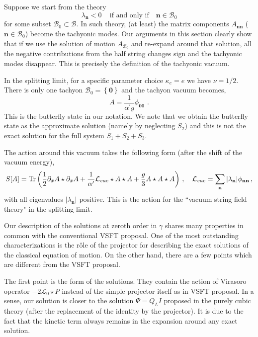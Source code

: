 \documentclass[a4paper,aps,preprint,nofootinbib,eqsecnum]{revtex4}
\begin{document}
Suppose we start from the theory
\begin{equation}
\lambda _{\mathbf{n}}<0\,\quad \mbox{if and only if}\quad \mathbf{n}\in
\mathcal{B}_{0}
\end{equation}%
for some subset $\mathcal{B}_{0}\subset \mathcal{B}$. In such theory, (at
least) the matrix components $A_{\mathbf{nn}}$ ($\mathbf{n}\in \mathcal{B}%
_{0}$) become the tachyonic modes. Our arguments in this section clearly
show that if we use the solution of motion $A_{\mathcal{B}_{0}}$ and
re-expand around that solution, all the negative contributions from the half
string changes sign and the tachyonic modes disappear. This is precisely the
definition of the tachyonic vacuum.

In the splitting limit, for a specific parameter choice $\kappa_e=e$ we have
$\nu=1/2$. There is only one tachyon $\mathcal{B}_0=\left\{\mathbf{0}%
\right\} $ and the tachyon vacuum becomes,
\begin{equation}  \label{tachyon-vacuum}
A=\frac{1}{{\alpha^{\prime}} g}\phi_{\mathbf{00}}\,\,.
\end{equation}
This is the butterfly state in our notation. We note that we obtain the
butterfly state as the approximate solution (namely by neglecting $S_2$) and
this is not the exact solution for the full system $S_1+S_2+S_3$.

The action around this vacuum takes the following form (after the shift of
the vacuum energy),
\begin{equation}
S[A]=\mbox{Tr}\left( \frac{1}{2}\partial_{\bar{x}}A\star \partial_{\bar{x}%
}A+ \frac{1}{{\alpha^{\prime}}} \mathcal{L}_{vac}\star A\star A+\frac{g}{3}%
A\star A\star A\right)\,, \quad \mathcal{L}_{vac}=\sum_{\mathbf{n}}|\lambda_{%
\mathbf{n}}| \phi_{\mathbf{nn}}\,,
\end{equation}
with all eigenvalues $|\lambda_\mathbf{n}|$ positive. This is the action for
the ``vacuum string field theory" in the splitting limit.

Our description of the solutions at zeroth order in $\gamma $ shares many
properties in common with the conventional VSFT proposal. One of the most
outstanding characterizations is the r\^{o}le of the projector for
describing the exact solutions of the classical equation of motion. On the
other hand, there are a few points which are different from the VSFT
proposal.

The first point is the form of the solutions. They contain the action of
Virasoro operator $-2{\mathcal{L}_{0}}\star P$ instead of the simple
projector itself as in VSFT proposal. In a sense, our solution is closer to
the solution $\Psi =Q_{L}I$ proposed in the purely cubic theory \cite{PSFT}
(after the replacement of the identity by the projector). It is due to the
fact that the kinetic term always remains in the expansion around any exact
solution.
\end{document}
